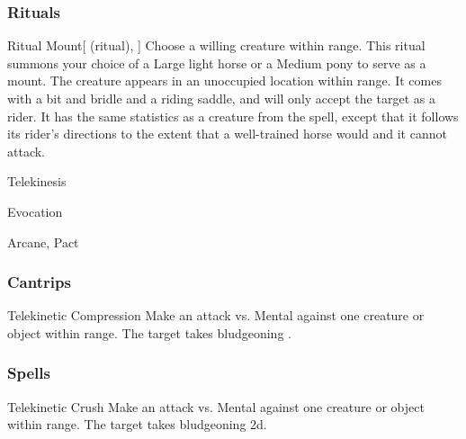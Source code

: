 \subsubsection{Rituals}


\lowercase{\hypertarget{spell:Ritual Mount}{}}\label{spell:Ritual Mount}
\begin{attuneability}[\nth{2}]{\hypertarget{spell:Ritual Mount}{Ritual Mount}}[ (ritual), ]
Choose a willing creature within \rngclose range.
This ritual summons your choice of a Large light horse or a Medium pony to serve as a mount.
The creature appears in an unoccupied location within \rngclose range.
It comes with a bit and bridle and a riding saddle, and will only accept the target as a rider.
It has the same statistics as a creature from the  spell, except that it follows its rider's directions to the extent that a well-trained horse would and it cannot attack.
\end{attuneability}
\vspace{0.25em}


\newpage
\begin{spellsection}{Telekinesis}

\begin{spellheader}
\end{spellheader}


 Evocation

 Arcane, Pact

\subsubsection{Cantrips}


\begin{freeability}{Telekinetic Compression}
Make an attack vs. Mental against one creature or object within \rngmed range.
\hit The target takes bludgeoning .
\end{freeability}

\end{spellsection}


\subsubsection{Spells}


\lowercase{\hypertarget{spell:Telekinetic Crush}{}}\label{spell:Telekinetic Crush}
\begin{apability}[\nth{1}]{\hypertarget{spell:Telekinetic Crush}{Telekinetic Crush}}
Make an attack vs. Mental against one creature or object within \rngmed range.
\hit The target takes bludgeoning  \plus2d.
\end{apability}
\vspace{0.25em}



